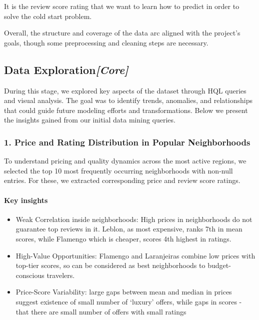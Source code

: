 It is the review score rating that we want to learn how to predict in order to solve the cold start problem.

Overall, the structure and coverage of the data arc aligned with the project's goals, though some preprocessing and cleaning steps are necessary.

\subsection{Data Exploration\textit{[Core]}}\label{sec:dataExploration}

During this stage, we explored key aspects of the dataset through HQL queries and visual analysis. The goal was to identify trends, anomalies, and relationships that could guide future modeling efforts and transformations. Below we present the insights gained from our initial data mining queries.

\subsubsection*{1. Price and Rating Distribution in Popular Neighborhoods}

To understand pricing and quality dynamics across the most active regions, we selected the top 10 most frequently occurring neighborhoods with non-null entries. For these, we extracted corresponding price and review score ratings.

\vspace{0.5em}
\paragraph{Key insights}
\begin{itemize}
    \item Weak Correlation inside neighborhoods: High prices in neighborhoods do not guarantee top reviews in it. Leblon, as most expensive, ranks 7th in mean scores, while Flamengo which is cheaper, scores 4th highest in ratings.
    \item High-Value Opportunities: Flamengo and Laranjeiras combine low prices with top-tier scores, so can be considered as best neighborhoods to budget-conscious travelers.
    \item Price-Score Variability: large gaps between mean and median in prices suggest existence of small number of `luxury' offers, while gaps in scores - that there are small number of offers with small ratings
\end{itemize}

